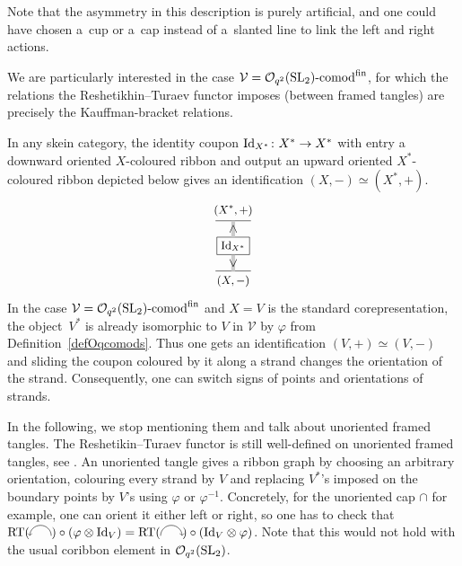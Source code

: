\documentclass[pdftex]{sigma}%
\numberwithin{equation}{section}
\newcommand{\rcap}{\tikz[scale = 0.3] \draw[->] (0,0) arc(180:0:1);}
\newcommand{\lcap}{\tikz[scale = 0.3] \draw[<-] (0,0) arc(180:0:1);}
\newcommand{\Oq}{\mathcal{O}_{q^2}({\rm SL}_2)}
\begin{document}
Note that the asymmetry in this description is purely artificial, and one could have chosen a~cup or a~cap instead of a~slanted line to link the left and right actions.
\begin{Example}
We are particularly interested in the case $\mathcal{V} = \Oq\text{-}{\rm comod}^{\rm fin}$, for which the relations the Reshetikhin--Turaev functor imposes (between framed tangles) are precisely the Kauffman-bracket relations.
\end{Example}

\begin{Remark}\label{rmkUnorTanOq}
In any skein category, the identity coupon ${\rm Id}_{X^*}\colon X^* \to X^*$ with entry a downward oriented $X$-coloured ribbon and output an upward oriented $X^*$-coloured ribbon depicted below gives an identification $(X,-) \simeq (X^*,+)$.
$$
\begin{tikzpicture}[yscale = 0.7, baseline = 0pt]
\draw (0,0) -- (1,0) node[midway,below]{\small $(X,-)$};
\draw (0,2) -- (1,2) node[midway,above]{\small $(X^*,+)$};
\node[draw, rectangle] (I) at (0.5,1) {\small ${\rm Id}_{X^*}$};
\draw[gray!40, line width = 3pt] (0.5,0) -- (I) node[midway, sloped, black]{$<$} -- (0.5,2) node[midway, sloped, black]{$>$};
\end{tikzpicture}
$$
In the case $\mathcal{V} = \Oq\text{-}{\rm comod}^{\rm fin}$ and $X = V$ is the standard corepresentation, the object~$V^*$ is already isomorphic to $V$ in $\mathcal{V}$ by $\varphi$ from Definition~\ref{defOqcomods}. Thus one gets an identification $(V,+) \simeq (V,-)$ and sliding the coupon coloured by it along a strand changes the orientation of the strand. Consequently, one can switch signs of points and orientations of strands.
\end{Remark}

 In the following, we stop mentioning them and talk about unoriented framed tangles. The Reshetikin--Turaev functor is still well-defined on unoriented framed tangles, see \cite[Theorem~4.2]{Tingley}. An unoriented tangle gives a ribbon graph by choosing an arbitrary orientation, colouring every strand by $V$ and replacing $V^*$'s imposed on the boundary points by $V$'s using $\varphi$ or $\varphi^{-1}$. Concretely, for the unoriented cap $\cap$ for example, one can orient it either left or right, so one has to check that $\mathop{\rm RT}(\lcap) \circ (\varphi \otimes {\rm Id}_V) = \mathop{\rm RT}(\rcap) \circ ({\rm Id}_V \otimes \varphi)$. Note that this would not hold with the usual coribbon element in $\Oq$.
\end{document}
